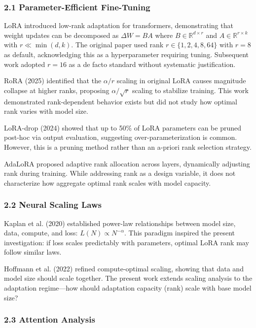 
\subsubsection{2.1 Parameter-Efficient Fine-Tuning}

LoRA \citep{hu2021lora} introduced low-rank adaptation for transformers, demonstrating that weight updates can be decomposed as $\Delta W = BA$ where $B \in \mathbb{R}^{d\times r}$ and $A \in \mathbb{R}^{r\times k}$ with $r \ll \min(d,k)$. The original paper used rank $r \in \{1, 2, 4, 8, 64\}$ with $r=8$ as default, acknowledging this as a hyperparameter requiring tuning. Subsequent work adopted $r=16$ as a de facto standard without systematic justification.

RoRA (2025) identified that the $\alpha/r$ scaling in original LoRA causes magnitude collapse at higher ranks, proposing $\alpha/\sqrt{r}$ scaling to stabilize training. This work demonstrated rank-dependent behavior exists but did not study how optimal rank varies with model size.

LoRA-drop (2024) showed that up to 50\% of LoRA parameters can be pruned post-hoc via output evaluation, suggesting over-parameterization is common. However, this is a pruning method rather than an a-priori rank selection strategy.

AdaLoRA \citep{adalora2023} proposed adaptive rank allocation across layers, dynamically adjusting rank during training. While addressing rank as a design variable, it does not characterize how aggregate optimal rank scales with model capacity.

\subsubsection{2.2 Neural Scaling Laws}

Kaplan et al. (2020) established power-law relationships between model size, data, compute, and loss: $L(N) \propto N^{-\alpha}$. This paradigm inspired the present investigation: if loss scales predictably with parameters, optimal LoRA rank may follow similar laws.

Hoffmann et al. (2022) refined compute-optimal scaling, showing that data and model size should scale together. The present work extends scaling analysis to the adaptation regime---how should adaptation capacity (rank) scale with base model size?

\subsubsection{2.3 Attention Analysis}

